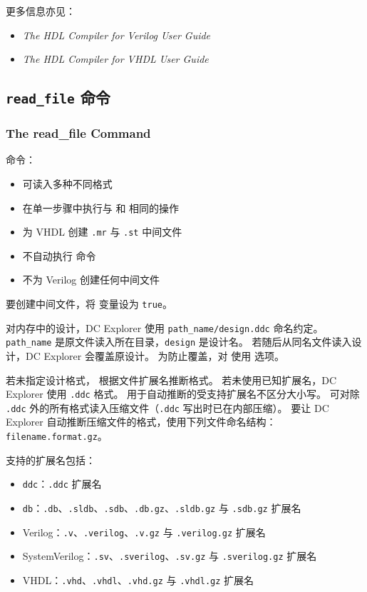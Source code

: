更多信息亦见：
\begin{itemize}
  \item \textit{The HDL Compiler for Verilog User Guide}
  \item \textit{The HDL Compiler for VHDL User Guide}
\end{itemize}

\subsection{\texttt{read\_file} 命令}
\subsubsection*{The read\_file Command}

 命令：
\begin{itemize}
  \item 可读入多种不同格式
  \item 在单一步骤中执行与  和  相同的操作
  \item 为 VHDL 创建 \texttt{.mr} 与 \texttt{.st} 中间文件
  \item 不自动执行  命令
  \item 不为 Verilog 创建任何中间文件
\end{itemize}

要创建中间文件，将  变量设为 \texttt{true}。

对内存中的设计，DC Explorer 使用 \texttt{path\_name/design.ddc} 命名约定。
\texttt{path\_name} 是原文件读入所在目录，\texttt{design} 是设计名。
若随后从同名文件读入设计，DC Explorer 会覆盖原设计。
为防止覆盖，对  使用  选项。

若未指定设计格式， 根据文件扩展名推断格式。
若未使用已知扩展名，DC Explorer 使用 \texttt{.ddc} 格式。
用于自动推断的受支持扩展名不区分大小写。
 可对除 \texttt{.ddc} 外的所有格式读入压缩文件（\texttt{.ddc} 写出时已在内部压缩）。
要让 DC Explorer 自动推断压缩文件的格式，使用下列文件命名结构：\texttt{filename.format.gz}。

支持的扩展名包括：
\begin{itemize}
  \item \texttt{ddc}：\texttt{.ddc} 扩展名
  \item \texttt{db}：\texttt{.db}、\texttt{.sldb}、\texttt{.sdb}、\texttt{.db.gz}、\texttt{.sldb.gz} 与 \texttt{.sdb.gz} 扩展名
  \item Verilog：\texttt{.v}、\texttt{.verilog}、\texttt{.v.gz} 与 \texttt{.verilog.gz} 扩展名
  \item SystemVerilog：\texttt{.sv}、\texttt{.sverilog}、\texttt{.sv.gz} 与 \texttt{.sverilog.gz} 扩展名
  \item VHDL：\texttt{.vhd}、\texttt{.vhdl}、\texttt{.vhd.gz} 与 \texttt{.vhdl.gz} 扩展名
\end{itemize}

